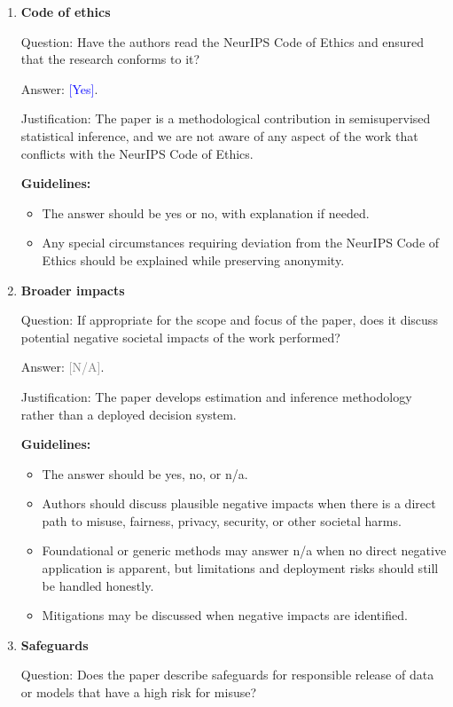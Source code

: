 \documentclass{article}
\theoremstyle{plain}
\theoremstyle{definition}
\newcommand{\1}{\mathbf{1}}
\providecommand{\answerYes}[1][]{\textcolor{blue}{[Yes]#1}}
\providecommand{\answerNA}[1][]{\textcolor{gray}{[N/A]#1}}
\begin{document}
\begin{enumerate}[leftmargin=5mm]
\item \textbf{Code of ethics}

Question: Have the authors read the NeurIPS Code of Ethics and ensured that the
research conforms to it?

Answer: \answerYes{}.

Justification: The paper is a methodological contribution in semisupervised
statistical inference, and we are not aware of any aspect of the work that
conflicts with the NeurIPS Code of Ethics.

\textbf{Guidelines:}
\begin{itemize}[leftmargin=5mm, noitemsep]
\item The answer should be yes or no, with explanation if needed.
\item Any special circumstances requiring deviation from the NeurIPS Code of
Ethics should be explained while preserving anonymity.
\end{itemize}

\item \textbf{Broader impacts}

Question: If appropriate for the scope and focus of the paper, does it discuss
potential negative societal impacts of the work performed?

Answer: \answerNA{}.

Justification: The paper develops estimation and inference methodology rather
than a deployed decision system.

\textbf{Guidelines:}
\begin{itemize}[leftmargin=5mm, noitemsep]
\item The answer should be yes, no, or n/a.
\item Authors should discuss plausible negative impacts when there is a direct
path to misuse, fairness, privacy, security, or other societal harms.
\item Foundational or generic methods may answer n/a when no direct negative
application is apparent, but limitations and deployment risks should still be
handled honestly.
\item Mitigations may be discussed when negative impacts are identified.
\end{itemize}

\item \textbf{Safeguards}

Question: Does the paper describe safeguards for responsible release of data or
models that have a high risk for misuse?


\end{enumerate}
\end{document}
